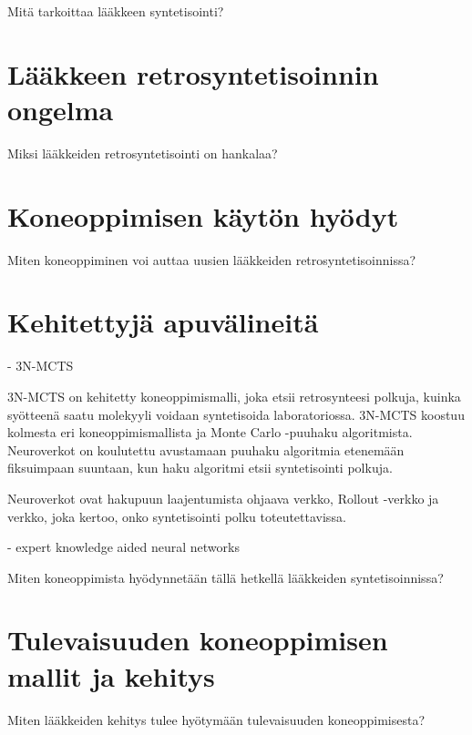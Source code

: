 \documentclass[finnish,twoside,censored,subject,sw-line]{HYthesisML}
\begin{document}
Mitä tarkoittaa lääkkeen syntetisointi?~\cite{deAlmeidaA.Filipa2019Socd}

\chapter{Lääkkeen retrosyntetisoinnin ongelma}

Miksi lääkkeiden retrosyntetisointi on hankalaa?~\cite{ButlerKeithT2018Mlfm,deAlmeidaA.Filipa2019Socd}

\chapter{Koneoppimisen käytön hyödyt}

Miten koneoppiminen voi auttaa uusien lääkkeiden retrosyntetisoinnissa?~\cite{VamathevanJessica2019Aoml}

\chapter{Kehitettyjä apuvälineitä}

- 3N-MCTS~\cite{SeglerMarwinHS2018Pcsw}

3N-MCTS on kehitetty koneoppimismalli, joka etsii retrosynteesi polkuja, kuinka
syötteenä saatu molekyyli voidaan syntetisoida laboratoriossa. 3N-MCTS koostuu
kolmesta eri koneoppimismallista ja Monte Carlo -puuhaku algoritmista. Neuroverkot
on koulutettu avustamaan puuhaku algoritmia etenemään fiksuimpaan suuntaan, kun
haku algoritmi etsii syntetisointi polkuja.

Neuroverkot ovat hakupuun laajentumista ohjaava verkko, Rollout -verkko ja
verkko, joka kertoo, onko syntetisointi polku toteutettavissa.

- expert knowledge aided neural networks~\cite{10.1145/3450439.3451879}

Miten koneoppimista hyödynnetään tällä hetkellä lääkkeiden syntetisoinnissa? ~\cite{SeglerMarwinHS2018Pcsw,10.1145/3219819.3219882,10.1145/3450439.3451879}

\chapter{Tulevaisuuden koneoppimisen mallit ja kehitys}

Miten lääkkeiden kehitys tulee hyötymään tulevaisuuden koneoppimisesta?~\cite{ButlerKeithT2018Mlfm}

\cleardoublepage                          %
{}  %
\printbibliography

\backmatter
\end{document}
